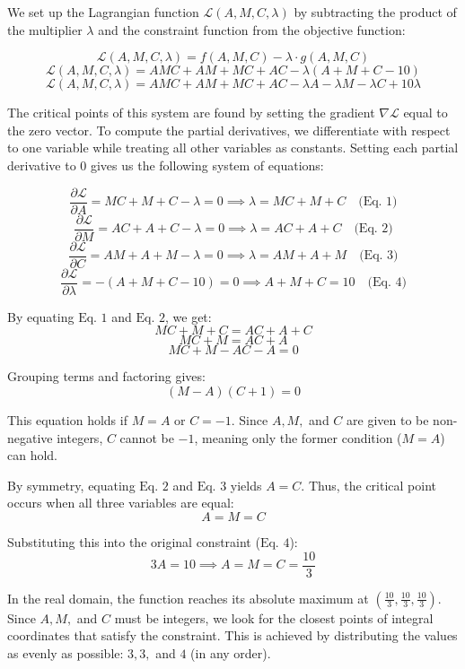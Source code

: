 \begin{enumerate}
 We set up the Lagrangian function $\mathcal{L}(A, M, C, \lambda)$ by subtracting the product of the multiplier $\lambda$ and the constraint function from the objective function:

 
 \[\mathcal{L}(A, M, C, \lambda) = f(A, M, C) - \lambda \cdot g(A, M, C)\]
 \[\mathcal{L}(A, M, C, \lambda) = AMC + AM + MC + AC - \lambda(A + M + C - 10)\]
 \[\mathcal{L}(A, M, C, \lambda) = AMC + AM + MC + AC - \lambda A - \lambda M - \lambda C + 10\lambda\]

 The critical points of this system are found by setting the gradient $\nabla\mathcal{L}$ equal to the zero vector. To compute the partial derivatives, we differentiate with respect to one variable while treating all other variables as constants. Setting each partial derivative to $0$ gives us the following system of equations:

 
 \[\frac{\partial \mathcal{L}}{\partial A} = MC + M + C - \lambda = 0 \implies \lambda = MC + M + C \quad \text{(Eq. 1)}\]
 \[\frac{\partial \mathcal{L}}{\partial M} = AC + A + C - \lambda = 0 \implies \lambda = AC + A + C \quad \text{(Eq. 2)}\]
 \[\frac{\partial \mathcal{L}}{\partial C} = AM + A + M - \lambda = 0 \implies \lambda = AM + A + M \quad \text{(Eq. 3)}\]
 \[\frac{\partial \mathcal{L}}{\partial \lambda} = -(A + M + C - 10) = 0 \implies A + M + C = 10 \quad \text{(Eq. 4)}\]

 By equating $\text{Eq. 1}$ and $\text{Eq. 2}$, we get:
 \[MC + M + C = AC + A + C\]
 \[MC + M = AC + A\]
 \[MC + M - AC - A = 0\]

 Grouping terms and factoring gives:
 \[(M - A)(C + 1) = 0\]

 This equation holds if $M = A$ or $C = -1$. Since $A, M,$ and $C$ are given to be non-negative integers, $C$ cannot be $-1$, meaning only the former condition ($M = A$) can hold.

 By symmetry, equating $\text{Eq. 2}$ and $\text{Eq. 3}$ yields $A = C$. Thus, the critical point occurs when all three variables are equal:
 \[A = M = C\]

 Substituting this into the original constraint ($\text{Eq. 4}$):
 \[3A = 10 \implies A = M = C = \frac{10}{3}\]

 In the real domain, the function reaches its absolute maximum at $\left(\frac{10}{3}, \frac{10}{3}, \frac{10}{3}\right)$. Since $A, M,$ and $C$ must be integers, we look for the closest points of integral coordinates that satisfy the constraint. This is achieved by distributing the values as evenly as possible: $3, 3,$ and $4$ (in any order).


\end{enumerate}
